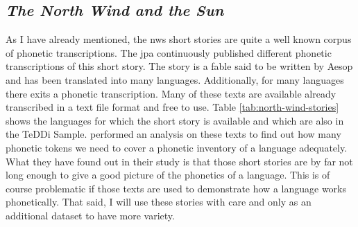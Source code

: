 
\subsection{\textit{The North Wind and the Sun}}
\label{nws}
As I have already mentioned, the \ac{nws} short stories are quite a well known corpus of phonetic transcriptions. The \ac{jpa} continuously published different phonetic transcriptions of this short story. The story is a fable said to be written by Aesop and has been translated into many languages. Additionally, for many languages there exits a phonetic transcription. Many of these texts are available already transcribed in a text file format and free to use. Table \ref{tab:north-wind-stories} shows the languages for which the short story is available and which are also in the TeDDi Sample. \citet{baird_evans_greenhill_2021} performed an analysis on these texts to find out how many phonetic tokens we need to cover a phonetic inventory of a language adequately. What they have found out in their study is that those short stories are by far not long enough to give a good picture of the phonetics of a language. This is of course problematic if those texts are used to demonstrate how a language works phonetically. That said, I will use these stories with care and only as an additional dataset to have more variety.

